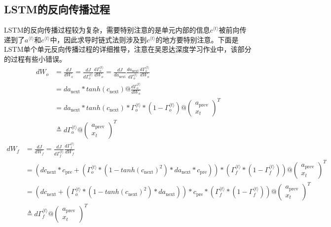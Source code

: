 \documentclass{ctexart}
\begin{document}
\subsection{LSTM的反向传播过程}
LSTM的反向传播过程较为复杂，需要特别注意的是单元内部的信息$c^{\langle t \rangle}$被前向传递到了$a^{\langle t \rangle}$和$c^{\langle t \rangle}$中，因此求导时链式法则涉及到$c^{\langle t \rangle}$的地方要特别注意。下面是LSTM单个单元反向传播过程的详细推导，注意在吴恩达深度学习作业中，该部分的过程有些小错误。
\begin{align*}
dW_o &= \frac{dJ}{dW_o}=\frac{dJ}{d\Gamma_o^{\langle t \rangle}}\frac{d\Gamma_o^{\langle t \rangle}}{dW_o}=\frac{dJ}{da_{\text{next}}}\frac{da_{\text{next}}}{d\Gamma_o^{\langle t \rangle}}\frac{d\Gamma_o^{\langle t \rangle}}{dW_o}\\&=da_{\text{next}}*tanh(c_{\text{next}})@\frac{d\Gamma_o^{\langle t \rangle}}{dW_o}\\
&=da_{\text{next}}*tanh(c_{\text{next}})*\Gamma_o^{\langle t \rangle}*(1-\Gamma_o^{\langle t \rangle})@\left(
\begin{matrix}
a_{\text{prev}}\\
x_t
\end{matrix}\right)^T\\
&\triangleq{d\Gamma_o^{\langle t \rangle}}@\left(
\begin{matrix}
a_{\text{prev}}\\
x_t
\end{matrix}\right)^T
\end{align*}
\begin{align*}
dW_f &= \frac{dJ}{dW_f}=\frac{dJ}{d\Gamma_f^{\langle t \rangle}}\frac{d\Gamma_f^{\langle t \rangle}}{dW_f}\\&=\left(dc_{\text{next}}*c_{\text{pre}}+\left(\Gamma_o^{\langle t\rangle}*(1-tanh(c_{\text{next}})^2)*da_{\text{next}}*c_{\text{pre}}\right)\right)*\left(\Gamma_f^{\langle t \rangle}*(1-\Gamma_f^{\langle t \rangle})\right)@\left(
\begin{matrix}
a_{\text{prev}}\\
x_t
\end{matrix}\right)^T\\
&=\left(dc_{\text{next}}+\left(\Gamma_o^{\langle t\rangle}*(1-tanh(c_{\text{next}})^2)*da_{\text{next}}\right)\right)*c_{\text{pre}}*\left(\Gamma_f^{\langle t \rangle}*(1-\Gamma_f^{\langle t \rangle})\right)@\left(
\begin{matrix}
a_{\text{prev}}\\
x_t
\end{matrix}\right)^T
\\
&\triangleq{d\Gamma_f^{\langle t \rangle}}@\left(
\begin{matrix}
a_{\text{prev}}\\
x_t
\end{matrix}\right)^T
\end{align*}
\end{document}
